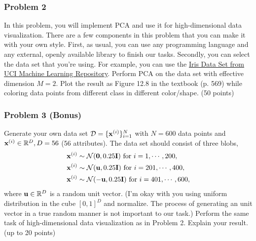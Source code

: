 \documentclass[12pt,a4paper]{article}
\renewcommand{\v}[1]{\ifmmode\mathbf{#1}\fi}
\newcommand{\R}{\ifmmode\mathbb R\fi}
\begin{document}
\subsubsection*{Problem 2}
In this problem, you will implement PCA and use it for high-dimensional data visualization. There are a few components in this problem that you can make it with your own style. First, as usual, you can use any programming language and any external, openly available library to finish our tasks. Secondly, you can select the data set that you're using. For example, you can use the \href{https://archive.ics.uci.edu/ml/datasets/iris}{Iris Data Set from UCI Machine Learning Repository}. Perform PCA on the data set with effective dimension $M = 2$. Plot the result as Figure 12.8 in the textbook (p. 569) while coloring data points from different class in different color/shape. (50 points)

\subsubsection*{Problem 3 (Bonus)}
Generate your own data set $\mathcal D = \{ \v x^{(i)} \}_{i=1}^N$ with $N = 600$ data points and $\v x^{(i)} \in \R^D, D = 56$ (56 attributes). The data set should consist of three blobs,
\begin{align*}
	\mathbf x^{(i)} &\sim \mathcal N(\v 0, 0.25\v I) \text{ for } i = 1, \cdots, 200, \\
	\mathbf x^{(i)} &\sim \mathcal N(\v u, 0.25\v I) \text{ for } i = 201, \cdots, 400, \\
	\mathbf x^{(i)} &\sim \mathcal N(-\v u, 0.25\v I) \text{ for } i = 401, \cdots, 600,
\end{align*}
where $\v u \in \R^D$ is a random unit vector. (I'm okay with you using uniform distribution in the cube $[0, 1]^D$ and normalize. The process of generating an unit vector in a true random manner is not important to our task.) Perform the same task of high-dimensional data visualization as in Problem 2. Explain your result. (up to 20 points)
\end{document}
